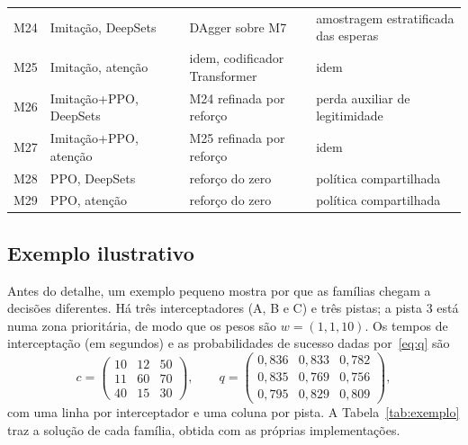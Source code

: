 \begin{table}[p]
\begin{tabularx}{\textwidth}{@{}l>{\raggedright}p{2.6cm}>{\raggedright}p{1.6cm}>{\raggedright\arraybackslash}X>{\raggedright\arraybackslash}X@{}}
M24 & Imitação, DeepSets & \cite{ross2011,zaheer2017} & DAgger sobre M7 & amostragem estratificada das esperas \\
M25 & Imitação, atenção & \cite{ross2011,kool2019} & idem, codificador Transformer & idem \\
M26 & Imitação+PPO, DeepSets & \cite{schulman2017} & M24 refinada por reforço & perda auxiliar de legitimidade \\
M27 & Imitação+PPO, atenção & \cite{schulman2017,jia2026} & M25 refinada por reforço & idem \\
M28 & PPO, DeepSets & \cite{liu2023drones,palmas2025} & reforço do zero & política compartilhada \\
M29 & PPO, atenção & \cite{jia2026} & reforço do zero & política compartilhada \\
\bottomrule
\end{tabularx}
\end{table}

\subsection{Exemplo ilustrativo}\label{sec:exemplo}
Antes do detalhe, um exemplo pequeno mostra por que as famílias chegam a decisões diferentes. Há três interceptadores (A,
B e C) e três pistas; a pista 3 está numa zona prioritária, de modo que os pesos são $w=(1,1,10)$. Os tempos de
interceptação (em segundos) e as probabilidades de sucesso dadas por~\eqref{eq:q} são
\begin{equation*}
  c=\begin{pmatrix} 10 & 12 & 50\\ 11 & 60 & 70\\ 40 & 15 & 30\end{pmatrix},
  \qquad
  q=\begin{pmatrix} 0{,}836 & 0{,}833 & 0{,}782\\ 0{,}835 & 0{,}769 & 0{,}756\\ 0{,}795 & 0{,}829 & 0{,}809\end{pmatrix},
\end{equation*}
com uma linha por interceptador e uma coluna por pista. A Tabela~\ref{tab:exemplo} traz a solução de cada família,
obtida com as próprias implementações.


